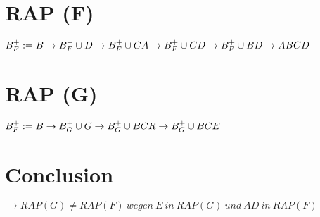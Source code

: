 \documentclass[]{article}
\title{}
\author{}
\begin{document}
\maketitle


\section{RAP (F)}
$B_F^+ := B \\
\rightarrow B_F^+ \cup D \\ 
\rightarrow  B_F^+\cup CA \\
\rightarrow B_F^+\cup CD  \\
\rightarrow B_F^+ \cup BD \\
\rightarrow ABCD
\ $
\section{RAP (G)}
$B_F^+ := B \\
\rightarrow B_G^+ \cup G \\ 
\rightarrow  B_G^+\cup BCR \\
\rightarrow B_G^+\cup BCE
\ $ \\
\section{Conclusion}
$\rightarrow RAP(G) \neq RAP(F) \ wegen \ E \ in \ RAP(G) \ und \ AD \ in \ RAP(F)$
\end{document}
